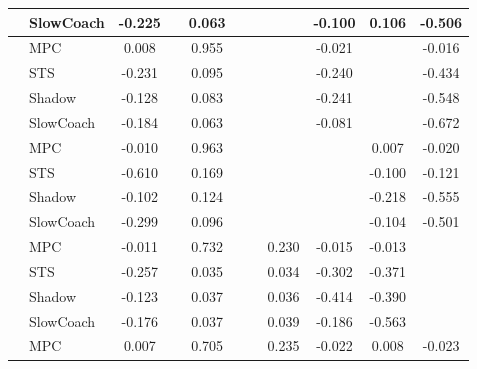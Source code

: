 \begin{tabular}{|l|l|*{9}{c|}}
                                                           & SlowCoach &   -0.225 &        &     0.063 &     &     &     &  -0.100 &   0.106 &   -0.506 \\
\midrule
[True, False, True, False, False, False, True, False, True] & MPC &    0.008 &        &     0.955 &     &     &     &  -0.021 &      &   -0.016 \\
                                                           & STS &   -0.231 &        &     0.095 &     &     &     &  -0.240 &      &   -0.434 \\
                                                           & Shadow &   -0.128 &        &     0.083 &     &     &     &  -0.241 &      &   -0.548 \\
                                                           & SlowCoach &   -0.184 &        &     0.063 &     &     &     &  -0.081 &      &   -0.672 \\
\midrule
[True, False, True, False, False, False, False, True, True] & MPC &   -0.010 &        &     0.963 &     &     &     &      &   0.007 &   -0.020 \\
                                                           & STS &   -0.610 &        &     0.169 &     &     &     &      &  -0.100 &   -0.121 \\
                                                           & Shadow &   -0.102 &        &     0.124 &     &     &     &      &  -0.218 &   -0.555 \\
                                                           & SlowCoach &   -0.299 &        &     0.096 &     &     &     &      &  -0.104 &   -0.501 \\
\midrule
[True, False, True, False, False, True, True, True, False] & MPC &   -0.011 &        &     0.732 &     &     &  0.230 &  -0.015 &  -0.013 &       \\
                                                           & STS &   -0.257 &        &     0.035 &     &     &  0.034 &  -0.302 &  -0.371 &       \\
                                                           & Shadow &   -0.123 &        &     0.037 &     &     &  0.036 &  -0.414 &  -0.390 &       \\
                                                           & SlowCoach &   -0.176 &        &     0.037 &     &     &  0.039 &  -0.186 &  -0.563 &       \\
\midrule
[True, False, True, False, False, True, True, True, True] & MPC &    0.007 &        &     0.705 &     &     &  0.235 &  -0.022 &   0.008 &   -0.023 \\

\end{tabular}
